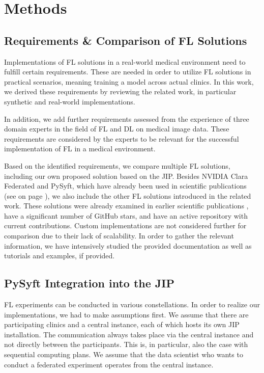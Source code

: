 \section{Methods}
\label{sec:Methods}

\subsection{Requirements \& Comparison of FL Solutions}
\label{subsec:MethodsRequirements}

Implementations of FL solutions in a real-world medical environment need to fulfill certain requirements. These are needed in order to utilize FL solutions in practical scenarios, meaning training a model across actual clinics. In this work, we derived these requirements by reviewing the related work, in particular synthetic and real-world implementations.

In addition, we add further requirements assessed from the experience of three domain experts in the field of FL and DL on medical image data. These requirements are considered by the experts to be relevant for the successful implementation of FL in a medical environment.

Based on the identified requirements, we compare multiple FL solutions, including our own proposed solution based on the JIP. Besides NVIDIA Clara Federated and PySyft, which have already been used in scientific publications (see  on page \pageref{subsec:LitRev}), we also include the other FL solutions introduced in the related work. These solutions were already examined in earlier scientific publications \citep{Li2019AProtection, He2020FedML:Learning}, have a significant number of GitHub stars, and have an active repository with current contributions. Custom implementations are not considered further for comparison due to their lack of scalability. In order to gather the relevant information, we have intensively studied the provided documentation as well as tutorials and examples, if provided.



\subsection{PySyft Integration into the JIP}
\label{subsec:MethodsPySyftIntegration}
FL experiments can be conducted in various constellations. In order to realize our implementations, we had to make assumptions first.
We assume that there are participating clinics and a central instance, each of which hosts its own JIP installation. The communication always takes place via the central instance and not directly between the participants. This is, in particular, also the case with sequential computing plans.
We assume that the data scientist who wants to conduct a federated experiment operates from the central instance.


